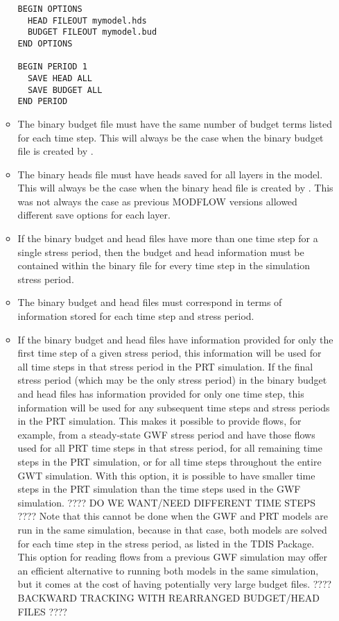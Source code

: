 \begin{itemize}
\begin{itemize}
\begin{verbatim}
BEGIN OPTIONS
  HEAD FILEOUT mymodel.hds
  BUDGET FILEOUT mymodel.bud
END OPTIONS

BEGIN PERIOD 1
  SAVE HEAD ALL
  SAVE BUDGET ALL
END PERIOD
\end{verbatim}

\item The binary budget file must have the same number of budget terms listed for each time step.  This will always be the case when the binary budget file is created by \mf.
\item The binary heads file must have heads saved for all layers in the model.  This will always be the case when the binary head file is created by \mf.  This was not always the case as previous MODFLOW versions allowed different save options for each layer.
\item If the binary budget and head files have more than one time step for a single stress period, then the budget and head information must be contained within the binary file for every time step in the simulation stress period.
\item The binary budget and head files must correspond in terms of information stored for each time step and stress period.
\item If the binary budget and head files have information provided for only the first time step of a given stress period, this information will be used for all time steps in that stress period in the PRT simulation. If the final stress period (which may be the only stress period) in the binary budget and head files has information provided for only one time step, this information will be used for any subsequent time steps and stress periods in the PRT simulation. This makes it possible to provide flows, for example, from a steady-state GWF stress period and have those flows used for all PRT time steps in that stress period, for all remaining time steps in the PRT simulation, or for all time steps throughout the entire GWT simulation. With this option, it is possible to have smaller time steps in the PRT simulation than the time steps used in the GWF simulation. ???? DO WE WANT/NEED DIFFERENT TIME STEPS ???? Note that this cannot be done when the GWF and PRT models are run in the same simulation, because in that case, both models are solved for each time step in the stress period, as listed in the TDIS Package. This option for reading flows from a previous GWF simulation may offer an efficient alternative to running both models in the same simulation, but it comes at the cost of having potentially very large budget files.  ???? BACKWARD TRACKING WITH REARRANGED BUDGET/HEAD FILES ????
\end{itemize}

\end{itemize}

